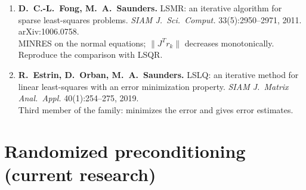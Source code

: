 \documentclass[11pt,a4paper]{article}
\begin{document}
\begin{enumerate}[resume]
\item \textbf{D.~C.-L.~Fong, M.~A.~Saunders.} LSMR: an iterative algorithm for sparse least-squares problems. \emph{SIAM J.\ Sci.\ Comput.} 33(5):2950--2971, 2011. arXiv:1006.0758.\\
MINRES on the normal equations; $\|J^Tr_k\|$ decreases monotonically. Reproduce the comparison with LSQR.

\item \textbf{R.~Estrin, D.~Orban, M.~A.~Saunders.} LSLQ: an iterative method for linear least-squares with an error minimization property. \emph{SIAM J.\ Matrix Anal.\ Appl.} 40(1):254--275, 2019.\\
Third member of the family: minimizes the error and gives error estimates.
\end{enumerate}

\section{Randomized preconditioning (current research)}
\end{document}
